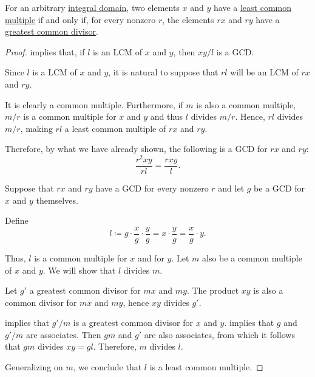 \begin{proposition}\label{thm:gcd_and_lcm_existence}
  For an arbitrary \hyperref[def:integral_domain]{integral domain}, two elements \( x \) and \( y \) have a \hyperref[def:lcm]{least common multiple} if and only if, for every nonzero \( r \), the elements \( rx \) and \( ry \) have a \hyperref[def:gcd]{greatest common divisor}.
\end{proposition}
\begin{proof}
  \SufficiencySubProof

    implies that, if \( l \) is an LCM of \( x \) and \( y \), then \( xy / l \) is a GCD.

   Since \( l \) is a LCM of \( x \) and \( y \), it is natural to suppose that \( rl \) will be an LCM of \( rx \) and \( ry \).

  It is clearly a common multiple. Furthermore, if \( m \) is also a common multiple, \( m / r \) is a common multiple for \( x \) and \( y \) and thus \( l \) divides \( m / r \). Hence, \( rl \) divides \( m / r \), making \( rl \) a least common multiple of \( rx \) and \( ry \).

  Therefore, by what we have already shown, the following is a GCD for \( rx \) and \( ry \):
  \begin{equation*}
    \frac {r^2 xy} {rl} = \frac {rxy} l.
  \end{equation*}

  \NecessitySubProof Suppose that \( rx \) and \( ry \) have a GCD for every nonzero \( r \) and let \( g \) be a GCD for \( x \) and \( y \) themselves.

  Define
  \begin{equation*}
    l \coloneqq g \cdot \frac x g \cdot \frac y g = x \cdot \frac y g = \frac x g \cdot y.
  \end{equation*}

  Thus, \( l \) is a common multiple for \( x \) and for \( y \). Let \( m \) also be a common multiple of \( x \) and \( y \). We will show that \( l \) divides \( m \).

  Let \( g' \) a greatest common divisor for \( mx \) and \( my \). The product \( xy \) is also a common divisor for \( mx \) and \( my \), hence \( xy \) divides \( g' \).

   implies that \( g' / m \) is a greatest common divisor for \( x \) and \( y \).  implies that \( g \) and \( g' / m \) are associates. Then \( gm \) and \( g' \) are also associates, from which it follows that \( gm \) divides \( xy = gl \). Therefore, \( m \) divides \( l \).

  Generalizing on \( m \), we conclude that \( l \) is a least common multiple.
\end{proof}

